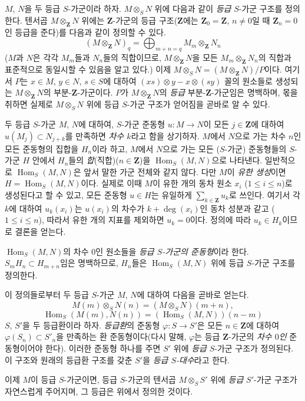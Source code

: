 \begin{env}[2.1.2]
\label{II.2.1.2-ko}
$M$, $N$을 두 등급 $S$-가군이라 하자. $M\otimes_S N$ 위에 다음과
같이 \emph{등급} $S$-가군 구조를 정의한다. 텐서곱
$M\otimes_{\mathbf{Z}}N$ 위에는
$\mathbf{Z}$-가군의 등급 구조($\mathbf{Z}$에는
$\mathbf{Z}_0=\mathbf{Z}$, $n\ne0$일 때 $\mathbf{Z}_n=0$인 등급을
준다)를 다음과 같이 정의할 수 있다.
\[
  (M\otimes_{\mathbf{Z}}N)_q
  =\bigoplus_{m+n=q}M_m\otimes_{\mathbf{Z}}N_n
\]
($M$과 $N$은 각각 $M_m$들과 $N_n$들의 직합이므로,
$M\otimes_{\mathbf{Z}}N$을 모든 $M_m\otimes_{\mathbf{Z}}N_n$의
직합과 표준적으로 동일시할 수 있음을 알고 있다.) 이제
$M\otimes_S N=(M\otimes_{\mathbf{Z}}N)/P$이다. 여기서 $P$는
$x\in M$, $y\in N$, $s\in S$에 대하여
$(xs)\otimes y-x\otimes(sy)$ 꼴의 원소들로 생성되는
$M\otimes_{\mathbf{Z}}N$의 부분-$\mathbf{Z}$-가군이다. $P$가
$M\otimes_{\mathbf{Z}}N$의 \emph{등급} 부분-$\mathbf{Z}$-가군임은
명백하며, 몫을 취하면 실제로 $M\otimes_S N$ 위에 등급 $S$-가군
구조가 얻어짐을 곧바로 알 수 있다.

두 등급 $S$-가군 $M$, $N$에 대하여, $S$-가군 준동형
$u:M\to N$이 모든 $j\in\mathbf{Z}$에 대하여
$u(M_j)\subset N_{j+k}$를 만족하면 \emph{차수 $k$}라고 함을
상기하자. $M$에서 $N$으로 가는 차수 $n$인 모든 준동형의 집합을
$H_n$이라 하고, $M$에서 $N$으로 가는 모든 ($S$-가군) 준동형들의
$S$-가군 $H$ 안에서 $H_n$들의 \emph{합}(직합)($n\in\mathbf{Z}$)을
$\operatorname{Hom}_S(M,N)$으로 나타낸다. 일반적으로
$\operatorname{Hom}_S(M,N)$은 앞서 말한 가군 전체와 같지 않다. 다만 $M$이
\emph{유한 생성}이면 $H=\operatorname{Hom}_S(M,N)$이다. 실제로 이때
$M$이 유한 개의 동차 원소 $x_i$ ($1\leq i\leq n$)로 생성된다고
할 수 있고, 모든 준동형 $u\in H$는 유일하게
$\sum_{k\in\mathbf{Z}}u_k$로 쓰인다. 여기서 각 $k$에 대하여
$u_k(x_i)$는 $u(x_i)$의 차수가 $k+\deg(x_i)$인 동차 성분과 같고
($1\leq i\leq n$), 따라서 유한 개의 지표를 제외하면 $u_k=0$이다.
정의에 따라 $u_k\in H_k$이므로 결론을 얻는다.

$\operatorname{Hom}_S(M,N)$의 차수 $0$인 원소들을 \emph{등급
$S$-가군의 준동형}이라 한다. $S_mH_n\subset H_{m+n}$임은 명백하므로,
$H_n$들은 $\operatorname{Hom}_S(M,N)$ 위에 등급 $S$-가군 구조를
정의한다.

이 정의들로부터 두 등급 $S$-가군 $M$, $N$에 대하여 다음을 곧바로
얻는다.
\[
  \label{II.2.1.2.1-ko}
  M(m)\otimes_S N(n)=(M\otimes_S N)(m+n),
  \tag{2.1.2.1}
\]
\[
  \label{II.2.1.2.2-ko}
  \operatorname{Hom}_S(M(m),N(n))
  =(\operatorname{Hom}_S(M,N))(n-m)
  \tag{2.1.2.2}
\]
$S$, $S'$을 두 등급환이라 하자. \emph{등급환}의 준동형
$\varphi:S\to S'$은 모든 $n\in\mathbf{Z}$에 대하여
$\varphi(S_n)\subset S'_n$을 만족하는 환 준동형이다(다시 말해,
$\varphi$는 등급 $\mathbf{Z}$-가군의 \emph{차수 $0$인} 준동형이어야
한다). 이러한 준동형 하나를 주면 $S'$ 위에 \emph{등급} $S$-가군 구조가
정의된다. 이 구조와 원래의 등급환 구조를 갖춘 $S'$을
\emph{등급 $S$-대수}라고 한다.

이제 $M$이 등급 $S$-가군이면, 등급 $S$-가군의 텐서곱
$M\otimes_S S'$ 위에 \emph{등급} $S'$-가군 구조가 자연스럽게 주어지며,
그 등급은 위에서 정의한 것이다.
\end{env}

